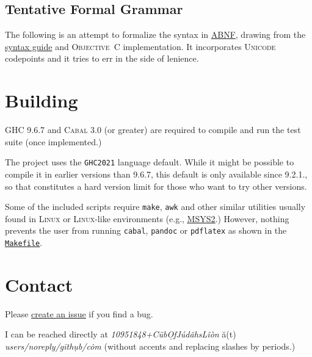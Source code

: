 \documentclass[11pt]{article}
\newcommand{\link}[2]{\underline{\color{darkblue}\href{#1}{#2}}}
\begin{document}
  \subsection*{Tentative Formal Grammar}
  The following is an attempt to formalize the syntax in
  \href{https://datatracker.ietf.org/doc/html/rfc5234}{\textsc{ABNF}},
  drawing from the \href{https://fountain.io/syntax/}{syntax guide} and
  \textsc{Objective~C} implementation.  It incorporates \textsc{Unicode}
  codepoints and it tries to err in the side of lenience.
  
  

\section*{Building}
\textsc{GHC} 9.6.7 and \textsc{Cabal} 3.0 (or greater) are required to
compile and run the test suite (once implemented.)

The project uses the \texttt{GHC2021} language default. While it might
be possible to compile it in earlier versions than 9.6.7, this default
is only available since 9.2.1., so that constitutes a hard version limit
for those who want to try other versions.

Some of the included scripts require \texttt{make}, \texttt{awk} and
other similar utilities usually found in \textsc{Linux} or
\textsc{Linux}-like environments (e.g.,
\link{https://www.msys2.org/}{\textsc{MSYS2}}.) However, nothing
prevents the user from running \texttt{cabal}, \texttt{pandoc} or
\texttt{pdflatex} as shown in the
\link{run:./Makefile}{\texttt{Makefile}}.

\section*{Contact} Please
\link{https://github.com/CubOfJudahsLion/fountain-parser/issues}{create an issue}
if you find a bug.

I can be reached directly at
\textrm{\emph{10951848+C\"{u}b\b{O}fJ\'{u}d\~{a}hsL\^{i}\`{o}n} \u{a}(t)
\emph{users/noreply/g\={i}th\d{u}b/c\.{o}m}} (without accents and
replacing slashes by periods.)
\end{document}

